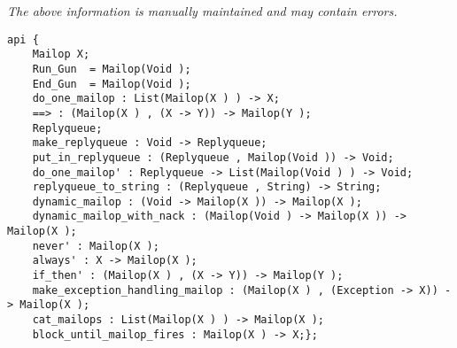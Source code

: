 \label{api:Mailop}

{\tiny \it The above information is manually maintained and may contain errors.}
\begin{verbatim}
api {
    Mailop X;
    Run_Gun  = Mailop(Void );
    End_Gun  = Mailop(Void );
    do_one_mailop : List(Mailop(X ) ) -> X;
    ==> : (Mailop(X ) , (X -> Y)) -> Mailop(Y );
    Replyqueue;
    make_replyqueue : Void -> Replyqueue;
    put_in_replyqueue : (Replyqueue , Mailop(Void )) -> Void;
    do_one_mailop' : Replyqueue -> List(Mailop(Void ) ) -> Void;
    replyqueue_to_string : (Replyqueue , String) -> String;
    dynamic_mailop : (Void -> Mailop(X )) -> Mailop(X );
    dynamic_mailop_with_nack : (Mailop(Void ) -> Mailop(X )) -> Mailop(X );
    never' : Mailop(X );
    always' : X -> Mailop(X );
    if_then' : (Mailop(X ) , (X -> Y)) -> Mailop(Y );
    make_exception_handling_mailop : (Mailop(X ) , (Exception -> X)) -> Mailop(X );
    cat_mailops : List(Mailop(X ) ) -> Mailop(X );
    block_until_mailop_fires : Mailop(X ) -> X;};
\end{verbatim}
\index[fun]{==>}
